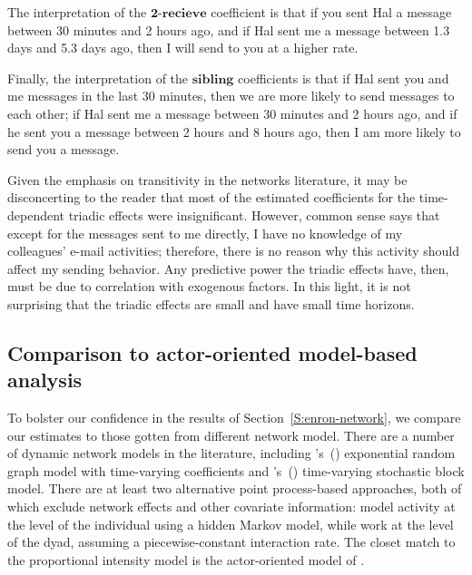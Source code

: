 \documentclass[final]{statsoc}
\begin{document}
The interpretation of the
$\textbf{2-recieve}$ coefficient is that if you sent Hal a message between 30
minutes and 2 hours ago, and if Hal sent me a message between 1.3 days and 5.3
days ago, then I will send to you at a higher rate.

Finally, the interpretation of the
$\textbf{sibling}$ coefficients is that if Hal sent you and me messages in the
last 30 minutes, then we are more likely to send messages to each other; if
Hal sent me a message between 30 minutes and 2 hours ago, and if he sent you a
message between 2 hours and 8 hours ago, then I am more likely to send you a
message.

Given the emphasis on transitivity in the networks literature, it may be
disconcerting to the reader that most of the estimated coefficients for the
time-dependent triadic effects were insignificant.  However,
common sense says that except for the messages sent to me directly, I have
no knowledge of my colleagues' e-mail activities; therefore, there is no
reason why this activity should affect my sending behavior.  Any predictive
power the triadic effects have, then, must be due to correlation with
exogenous factors.  In this light, it is not surprising that the triadic
effects are small and have small time horizons.


\subsection{Comparison to actor-oriented model-based analysis}

To bolster our confidence in the results of Section~\ref{S:enron-network},
we compare our estimates to those gotten from different network model.
There are a number of dynamic network models in the literature, including
's~(\citeyear{hanneke2010discrete})
exponential random graph model with time-varying coefficients  and
's~(\citeyear{kolar2010estimating})
time-varying stochastic block model.  There are at least two alternative point
process-based approaches, both of which exclude network effects and other
covariate information: \citet{malmgen2009characterizing} model activity at the
level of the individual using a hidden Markov model, while
\citet{heard2010bayesian} work at the level of the dyad, assuming a
piecewise-constant interaction rate.  The closet match to the proportional
intensity model is the actor-oriented model of
\citet{snijders2001statistical,snijders2005models}.
\end{document}
